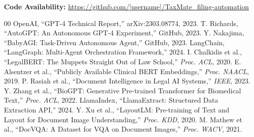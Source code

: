 \documentclass[conference]{IEEEtran}
\begin{document}
\textbf{Code Availability:} \url{https://github.com/[username]/TaxMate_filing-automation}

\begin{thebibliography}{00}
 OpenAI, ``GPT-4 Technical Report,'' arXiv:2303.08774, 2023.
 T. Richards, ``AutoGPT: An Autonomous GPT-4 Experiment,'' GitHub, 2023.
 Y. Nakajima, ``BabyAGI: Task-Driven Autonomous Agent,'' GitHub, 2023.
 LangChain, ``LangGraph: Multi-Agent Orchestration Framework,'' 2024.
 I. Chalkidis et al., ``LegalBERT: The Muppets Straight Out of Law School,'' \textit{Proc. ACL}, 2020.
 E. Alsentzer et al., ``Publicly Available Clinical BERT Embeddings,'' \textit{Proc. NAACL}, 2019.
 P. Rasiah et al., ``Document Intelligence in Legal AI Systems,'' \textit{IEEE}, 2023.
 Y. Zhang et al., ``BioGPT: Generative Pre-trained Transformer for Biomedical Text,'' \textit{Proc. ACL}, 2022.
 LlamaIndex, ``LlamaExtract: Structured Data Extraction API,'' 2024.
 Y. Xu et al., ``LayoutLM: Pre-training of Text and Layout for Document Image Understanding,'' \textit{Proc. KDD}, 2020.
 M. Mathew et al., ``DocVQA: A Dataset for VQA on Document Images,'' \textit{Proc. WACV}, 2021.
\end{thebibliography}

\vspace{12pt}
\end{document}
